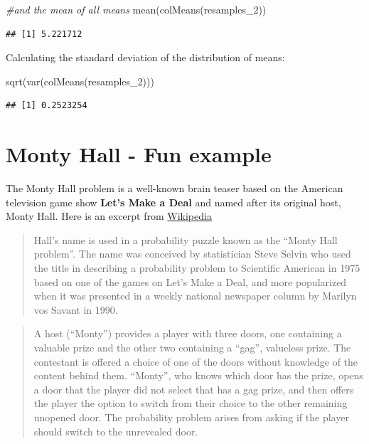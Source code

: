 \documentclass[
]{book}
\newenvironment{Shaded}{\begin{snugshade}}{\end{snugshade}}
\newcommand{\CommentTok}[1]{\textcolor[rgb]{0.56,0.35,0.01}{\textit{#1}}}
\newcommand{\FunctionTok}[1]{\textcolor[rgb]{0.00,0.00,0.00}{#1}}
\newcommand{\NormalTok}[1]{#1}
\begin{document}
\begin{Shaded}
\begin{Highlighting}[]
\CommentTok{\#and the mean of all means}
\FunctionTok{mean}\NormalTok{(}\FunctionTok{colMeans}\NormalTok{(resamples\_2))}
\end{Highlighting}
\end{Shaded}

\begin{verbatim}
## [1] 5.221712
\end{verbatim}

Calculating the standard deviation of the distribution of means:

\begin{Shaded}
\begin{Highlighting}[]
\FunctionTok{sqrt}\NormalTok{(}\FunctionTok{var}\NormalTok{(}\FunctionTok{colMeans}\NormalTok{(resamples\_2)))}
\end{Highlighting}
\end{Shaded}

\begin{verbatim}
## [1] 0.2523254
\end{verbatim}

\hypertarget{monty-hall---fun-example}{%
\section{Monty Hall - Fun example}\label{monty-hall---fun-example}}

The Monty Hall problem is a well-known brain teaser based on the American television game show \textbf{Let's Make a Deal} and named after its original host, Monty Hall. Here is an excerpt from \href{https://en.wikipedia.org/wiki/Monty_Hall}{Wikipedia}

\begin{quote}
Hall's name is used in a probability puzzle known as the ``Monty Hall problem''. The name was conceived by statistician Steve Selvin who used the title in describing a probability problem to Scientific American in 1975 based on one of the games on Let's Make a Deal, and more popularized when it was presented in a weekly national newspaper column by Marilyn vos Savant in 1990.
\end{quote}

\begin{quote}
A host (``Monty'') provides a player with three doors, one containing a valuable prize and the other two containing a ``gag'', valueless prize. The contestant is offered a choice of one of the doors without knowledge of the content behind them. ``Monty'', who knows which door has the prize, opens a door that the player did not select that has a gag prize, and then offers the player the option to switch from their choice to the other remaining unopened door. The probability problem arises from asking if the player should switch to the unrevealed door.
\end{quote}
\end{document}
